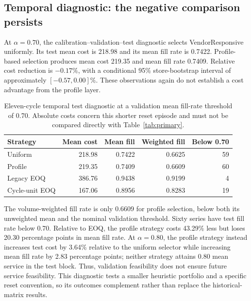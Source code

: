 \documentclass[preprint,12pt]{elsarticle}
\begin{document}
\subsection{Temporal diagnostic: the negative comparison persists}
At $\alpha=0.70$, the calibration--validation--test diagnostic selects VendorResponsive uniformly. Its test mean cost is 218.98 and its mean fill rate is 0.7422. Profile-based selection produces mean cost 219.35 and mean fill rate 0.7409. Relative cost reduction is $-0.17\%$, with a conditional 95\% store-bootstrap interval of approximately $[-0.57,0.00]\%$. These observations again do not establish a cost advantage from the profile layer.

\begin{table}[htbp]
\centering\small
\caption{Eleven-cycle temporal test diagnostic at a validation mean fill-rate threshold of 0.70. Absolute costs concern this shorter reset episode and must not be compared directly with Table~\ref{tab:primary}.}\label{tab:temporal}
\begin{tabular}{lrrrr}
\toprule
Strategy & Mean cost & Mean fill & Weighted fill & Below 0.70\\
\midrule
Uniform & 218.98 & 0.7422 & 0.6625 & 59\\
Profile & 219.35 & 0.7409 & 0.6609 & 60\\
Legacy EOQ & 386.76 & 0.9438 & 0.9199 & 4\\
Cycle-unit EOQ & 167.06 & 0.8956 & 0.8283 & 19\\
\bottomrule
\end{tabular}
\end{table}

The volume-weighted fill rate is only 0.6609 for profile selection, below both its unweighted mean and the nominal validation threshold. Sixty series have test fill rate below 0.70. Relative to EOQ, the profile strategy costs 43.29\% less but loses 20.30 percentage points in mean fill rate. At $\alpha=0.80$, the profile strategy instead increases test cost by 3.64\% relative to the uniform selector while increasing mean fill rate by 2.83 percentage points; neither strategy attains 0.80 mean service in the test block. Thus, validation feasibility does not ensure future service feasibility. This diagnostic tests a smaller heuristic portfolio and a specific reset convention, so its outcomes complement rather than replace the historical-matrix results.
\end{document}
